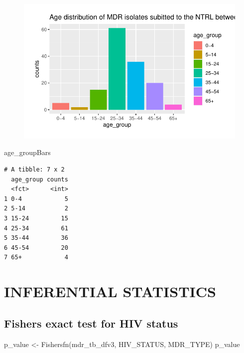 \documentclass[
]{report}
\newenvironment{Shaded}{\begin{snugshade}}{\end{snugshade}}
\newcommand{\FunctionTok}[1]{\textcolor[rgb]{0.28,0.35,0.67}{#1}}
\newcommand{\NormalTok}[1]{\textcolor[rgb]{0.00,0.23,0.31}{#1}}
\newcommand{\OtherTok}[1]{\textcolor[rgb]{0.00,0.23,0.31}{#1}}
\newcommand{\StringTok}[1]{\textcolor[rgb]{0.13,0.47,0.30}{#1}}
\begin{document}
\begin{figure}[H]

{\centering \includegraphics{MDR_TB_files/figure-pdf/unnamed-chunk-14-1.pdf}

}

\end{figure}

\begin{Shaded}
\begin{Highlighting}[]
\NormalTok{age\_groupBars}
\end{Highlighting}
\end{Shaded}

\begin{verbatim}
# A tibble: 7 x 2
  age_group counts
  <fct>      <int>
1 0-4            5
2 5-14           2
3 15-24         15
4 25-34         61
5 35-44         36
6 45-54         20
7 65+            4
\end{verbatim}

\hypertarget{inferential-statistics}{%
\chapter{\texorpdfstring{\textbf{INFERENTIAL
STATISTICS}}{INFERENTIAL STATISTICS}}\label{inferential-statistics}}

\hypertarget{fishers-exact-test-for-hiv-status}{%
\section{Fishers exact test for HIV
status}\label{fishers-exact-test-for-hiv-status}}

\begin{Shaded}
\begin{Highlighting}[]
\NormalTok{p\_value }\OtherTok{\textless{}{-}} \FunctionTok{Fishersfn}\NormalTok{(mdr\_tb\_dfv3, }\StringTok{\textquotesingle{}HIV\_STATUS\textquotesingle{}}\NormalTok{, }\StringTok{\textquotesingle{}MDR\_TYPE\textquotesingle{}}\NormalTok{)}
\NormalTok{p\_value }
\end{Highlighting}
\end{Shaded}
\end{document}
